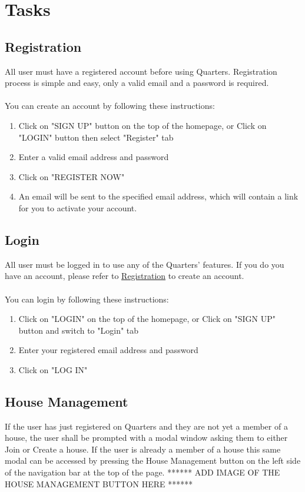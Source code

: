 \documentclass[12pt]{article}
\begin{document}
    \section{Tasks}

    \subsection{Registration}
    \label{sec:registration}
    All user must have a registered account before using Quarters. Registration process is simple and easy, only a valid email and a password is required.\\\\
    You can create an account by following these instructions:

    \begin{enumerate}
        \item Click on "SIGN UP" button on the top of the homepage, or Click on "LOGIN" button then select "Register" tab
        \item Enter a valid email address and password
        \item Click on "REGISTER NOW"
        \item An email will be sent to the specified email address, which will contain a link for you to activate your account.
    \end{enumerate}
    \subsection{Login}
    All user must be logged in to use any of the Quarters' features. If you do you have an account, please refer to \hyperref[sec:registration]{Registration} to create an account. \\ \\
    You can login by following these instructions:
    \begin{enumerate}
        \item Click on "LOGIN" on the top of the homepage, or Click on "SIGN UP" button and switch to "Login" tab
        \item Enter your registered email address and password
        \item Click on "LOG IN"
    \end{enumerate}
    \subsection{House Management} %
    \label{sec:housemanagement}
    If the user has just registered on Quarters and they are not yet a member of a house, the user shall be prompted with a modal window asking them to either Join or Create a house. If the user is already a member of a house this same modal can be accessed by pressing the House Management button on the  left side of the navigation bar at the top of the page. ****** ADD IMAGE OF THE HOUSE MANAGEMENT BUTTON HERE ******
\end{document}
